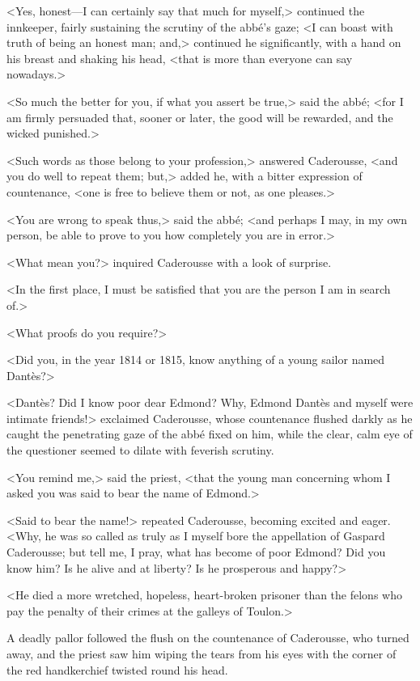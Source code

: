  <Yes, honest—I can certainly say that much for myself,> continued the innkeeper, fairly sustaining the scrutiny of the abbé's gaze; <I can boast with truth of being an honest man; and,> continued he significantly, with a hand on his breast and shaking his head, <that is more than everyone can say nowadays.>

<So much the better for you, if what you assert be true,> said the abbé; <for I am firmly persuaded that, sooner or later, the good will be rewarded, and the wicked punished.> 

 <Such words as those belong to your profession,> answered Caderousse, <and you do well to repeat them; but,> added he, with a bitter expression of countenance, <one is free to believe them or not, as one pleases.> 

 <You are wrong to speak thus,> said the abbé; <and perhaps I may, in my own person, be able to prove to you how completely you are in error.> 

 <What mean you?> inquired Caderousse with a look of surprise. 

 <In the first place, I must be satisfied that you are the person I am in search of.> 

 <What proofs do you require?> 

 <Did you, in the year 1814 or 1815, know anything of a young sailor named Dantès?> 

 <Dantès? Did I know poor dear Edmond? Why, Edmond Dantès and myself were intimate friends!> exclaimed Caderousse, whose countenance flushed darkly as he caught the penetrating gaze of the abbé fixed on him, while the clear, calm eye of the questioner seemed to dilate with feverish scrutiny. 

 <You remind me,> said the priest, <that the young man concerning whom I asked you was said to bear the name of Edmond.> 

 <Said to bear the name!> repeated Caderousse, becoming excited and eager. <Why, he was so called as truly as I myself bore the appellation of Gaspard Caderousse; but tell me, I pray, what has become of poor Edmond? Did you know him? Is he alive and at liberty? Is he prosperous and happy?> 

 <He died a more wretched, hopeless, heart-broken prisoner than the felons who pay the penalty of their crimes at the galleys of Toulon.> 

 A deadly pallor followed the flush on the countenance of Caderousse, who turned away, and the priest saw him wiping the tears from his eyes with the corner of the red handkerchief twisted round his head. 

